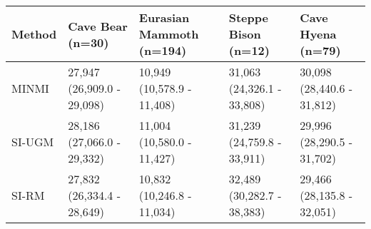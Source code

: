 
\begin{tabular}{lllll}
\toprule
Method & Cave Bear (n=30) & Eurasian Mammoth (n=194) & Steppe Bison (n=12) & Cave Hyena (n=79)\\
\midrule
MINMI & 27,947 (26,909.0 - 29,098) & 10,949 (10,578.9 - 11,408) & 31,063 (24,326.1 - 33,808) & 30,098 (28,440.6 - 31,812)\\
SI-UGM & 28,186 (27,066.0 - 29,332) & 11,004 (10,580.0 - 11,427) & 31,239 (24,759.8 - 33,911) & 29,996 (28,290.5 - 31,702)\\
SI-RM & 27,832 (26,334.4 - 28,649) & 10,832 (10,246.8 - 11,034) & 32,489 (30,282.7 - 38,383) & 29,466 (28,135.8 - 32,051)\\
\bottomrule
\end{tabular}
